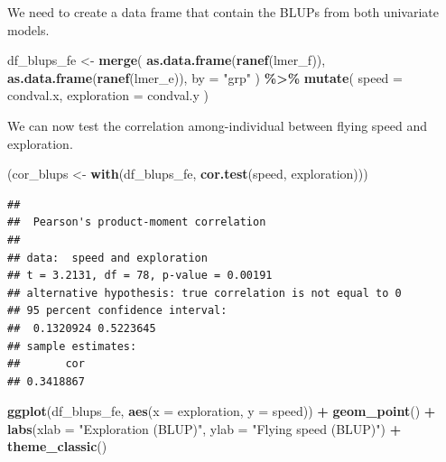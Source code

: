 \documentclass[
  12pt,
]{book}
\newenvironment{Shaded}{\begin{snugshade}}{\end{snugshade}}
\newcommand{\DataTypeTok}[1]{\textcolor[rgb]{0.13,0.29,0.53}{#1}}
\newcommand{\KeywordTok}[1]{\textcolor[rgb]{0.13,0.29,0.53}{\textbf{#1}}}
\newcommand{\NormalTok}[1]{#1}
\newcommand{\OperatorTok}[1]{\textcolor[rgb]{0.81,0.36,0.00}{\textbf{#1}}}
\newcommand{\StringTok}[1]{\textcolor[rgb]{0.31,0.60,0.02}{#1}}
\begin{document}
We need to create a data frame that contain the BLUPs from both univariate models.

\begin{Shaded}
\begin{Highlighting}[]
\NormalTok{df\_blups\_fe \textless{}{-}}\StringTok{ }\KeywordTok{merge}\NormalTok{(}
  \KeywordTok{as.data.frame}\NormalTok{(}\KeywordTok{ranef}\NormalTok{(lmer\_f)),}
  \KeywordTok{as.data.frame}\NormalTok{(}\KeywordTok{ranef}\NormalTok{(lmer\_e)),}
  \DataTypeTok{by =} \StringTok{"grp"}
\NormalTok{) }\OperatorTok{\%\textgreater{}\%}
\StringTok{  }\KeywordTok{mutate}\NormalTok{(}
    \DataTypeTok{speed =}\NormalTok{ condval.x,}
    \DataTypeTok{exploration =}\NormalTok{ condval.y}
\NormalTok{  )}
\end{Highlighting}
\end{Shaded}

We can now test the correlation among-individual between flying speed and exploration.

\begin{Shaded}
\begin{Highlighting}[]
\NormalTok{(cor\_blups \textless{}{-}}\StringTok{ }\KeywordTok{with}\NormalTok{(df\_blups\_fe, }\KeywordTok{cor.test}\NormalTok{(speed, exploration)))}
\end{Highlighting}
\end{Shaded}

\begin{verbatim}
## 
##  Pearson's product-moment correlation
## 
## data:  speed and exploration
## t = 3.2131, df = 78, p-value = 0.00191
## alternative hypothesis: true correlation is not equal to 0
## 95 percent confidence interval:
##  0.1320924 0.5223645
## sample estimates:
##       cor 
## 0.3418867
\end{verbatim}

\begin{Shaded}
\begin{Highlighting}[]
\KeywordTok{ggplot}\NormalTok{(df\_blups\_fe, }\KeywordTok{aes}\NormalTok{(}\DataTypeTok{x =}\NormalTok{ exploration, }\DataTypeTok{y =}\NormalTok{ speed)) }\OperatorTok{+}
\StringTok{  }\KeywordTok{geom\_point}\NormalTok{() }\OperatorTok{+}
\StringTok{  }\KeywordTok{labs}\NormalTok{(}\DataTypeTok{xlab =} \StringTok{"Exploration (BLUP)"}\NormalTok{, }\DataTypeTok{ylab =} \StringTok{"Flying speed (BLUP)"}\NormalTok{) }\OperatorTok{+}
\StringTok{  }\KeywordTok{theme\_classic}\NormalTok{()}
\end{Highlighting}
\end{Shaded}
\end{document}
